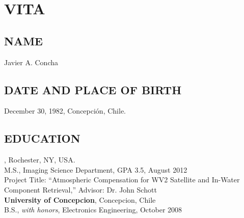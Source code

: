 \chapter*{VITA}

\section*{NAME} 
\noindent Javier A. Concha

\section*{DATE AND PLACE OF BIRTH} 
\noindent December 30, 1982, Concepci\'on, Chile.

\section*{EDUCATION}
, Rochester, NY, USA.\\
M.S., Imaging Science Department, GPA 3.5, August 2012\\
Project Title: ``Atmospheric Compensation for WV2 Satellite and In-Water Component Retrieval,'' Advisor: Dr. John Schott
\vspace{0.1in}\\
{\bf University of Concepcion}, Concepcion, Chile \\
B.S., {\it with honors}, Electronics Engineering, October 2008\\

\pagestyle{empty}